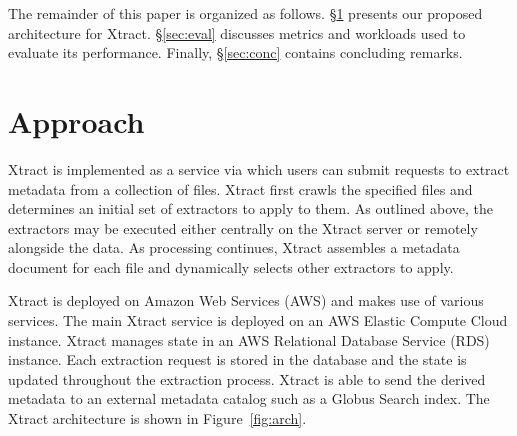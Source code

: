\documentclass[sigconf]{acmart}
\newcommand{\name}{Xtract}
\begin{document}
The remainder of this paper is organized as follows. 
\S\ref{sec:approach} presents our proposed architecture for \name{}. 
\S\ref{sec:eval} discusses metrics and workloads used to evaluate its performance. 
Finally, \S\ref{sec:conc} contains concluding remarks.


\section{Approach}
\label{sec:approach}

\name{} is implemented as a service via which users can submit
requests to extract metadata from a collection of files.
\name{} first crawls the specified files and determines
an initial set of extractors to apply to them. 
As outlined above, the extractors may be executed
either centrally on the \name{} server or remotely alongside
the data. As processing continues, \name{} assembles 
a metadata document for each file and dynamically selects
other extractors to apply.


\name{} is deployed on Amazon Web Services (AWS) and makes use
of various services. The main \name{} service
is deployed on an AWS Elastic Compute Cloud instance.
\name{} manages state in an AWS Relational Database Service (RDS)
instance. Each extraction request is stored in the database
and the state is updated throughout the extraction process. 
\name{} is able to send the derived metadata to an external
metadata catalog such as a Globus Search index.
The \name{} architecture is shown in Figure~\ref{fig:arch}.
\end{document}
